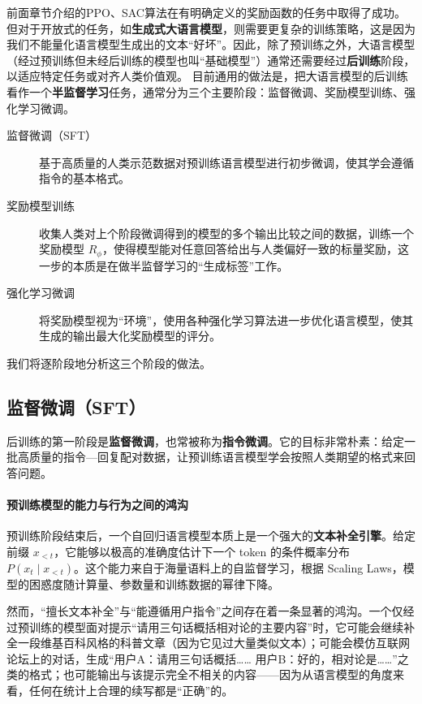前面章节介绍的PPO、SAC算法在有明确定义的奖励函数的任务中取得了成功。但对于开放式的任务，如\textbf{生成式大语言模型}，则需要更复杂的训练策略，这是因为我们不能量化语言模型生成出的文本“好坏”。因此，除了预训练之外，大语言模型（经过预训练但未经后训练的模型也叫“基础模型”）通常还需要经过\textbf{后训练}阶段，以适应特定任务或对齐人类价值观。
目前通用的做法是，把大语言模型的后训练看作一个\textbf{半监督学习}任务，通常分为三个主要阶段：监督微调、奖励模型训练、强化学习微调。
\begin{description}
\item[监督微调（SFT）] 基于高质量的人类示范数据对预训练语言模型进行初步微调，使其学会遵循指令的基本格式。
\item[奖励模型训练] 收集人类对上个阶段微调得到的模型的多个输出比较之间的数据，训练一个奖励模型 $R_\phi$，使得模型能对任意回答给出与人类偏好一致的标量奖励，这一步的本质是在做半监督学习的“生成标签”工作。
\item[强化学习微调] 将奖励模型视为“环境”，使用各种强化学习算法进一步优化语言模型，使其生成的输出最大化奖励模型的评分。
\end{description}
我们将逐阶段地分析这三个阶段的做法。

\subsection{监督微调（SFT）}

后训练的第一阶段是\textbf{监督微调}，也常被称为\textbf{指令微调}。它的目标非常朴素：给定一批高质量的指令—回复配对数据，让预训练语言模型学会按照人类期望的格式来回答问题。

\paragraph{预训练模型的能力与行为之间的鸿沟}

预训练阶段结束后，一个自回归语言模型本质上是一个强大的\textbf{文本补全引擎}。给定前缀 $x_{<t}$，它能够以极高的准确度估计下一个 token 的条件概率分布 $P(x_t \mid x_{<t})$。这个能力来自于海量语料上的自监督学习，根据 Scaling Laws，模型的困惑度随计算量、参数量和训练数据的幂律下降\cite{kaplan2020scalinglawsneurallanguage}。

然而，“擅长文本补全”与“能遵循用户指令”之间存在着一条显著的鸿沟。一个仅经过预训练的模型面对提示“请用三句话概括相对论的主要内容”时，它可能会继续补全一段维基百科风格的科普文章（因为它见过大量类似文本）；可能会模仿互联网论坛上的对话，生成“用户A：请用三句话概括…… 用户B：好的，相对论是……”之类的格式；也可能输出与该提示完全不相关的内容——因为从语言模型的角度来看，任何在统计上合理的续写都是“正确”的。

